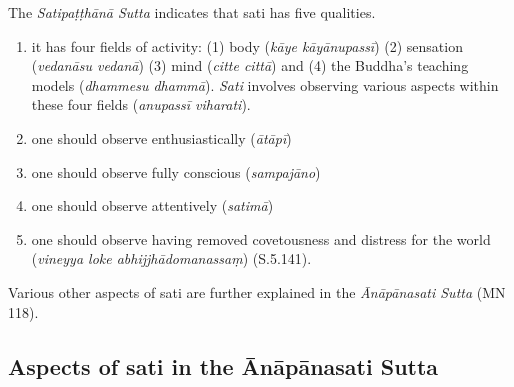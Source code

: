The \textit{Satipaṭṭhānā Sutta} indicates that sati has five qualities.

\begin{enumerate}
\item it has four fields of activity: (1) body (\textit{kāye kāyānupassī}) (2) sensation (\textit{vedanāsu vedanā}) (3) mind (\textit{citte cittā}) and (4) the Buddha's teaching models (\textit{dhammesu dhammā}). \textit{Sati} involves observing various aspects within these four fields (\textit{anupassī viharati}).
\item one should observe enthusiastically (\textit{ātāpī})
\item one should observe fully conscious (\textit{sampajāno})
\item one should observe attentively (\textit{satimā})
\item one should observe having removed covetousness and distress for the world (\textit{vineyya loke abhijjhādomanassaṃ}) (S.5.141).
\end{enumerate}

Various other aspects of sati are further explained in the \textit{Ānāpānasati Sutta} (MN 118).

\subsection*{Aspects of sati in the \=An\=ap\=anasati Sutta}

